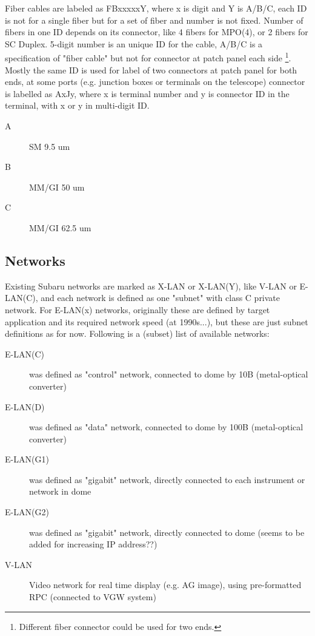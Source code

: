 \documentclass[a4paper,notitlepage]{article}
\begin{document}
Fiber cables are labeled as FBxxxxxY, where x is digit and Y is A/B/C, 
each ID is not for a single fiber but for a set of fiber and number is not 
fixed. Number of fibers in one ID depends on its connector, like 4 fibers for 
MPO(4), or 2 fibers for SC Duplex. 
5-digit number is an unique ID for the cable, A/B/C is a specification of 
"fiber cable" but not for connector at patch panel each side
\footnote{Different fiber connector could be used for two ends.}.
Mostly the same ID is used for label of two connectors at patch panel for both 
ends, at some ports (e.g. junction boxes or terminals on the telescope) 
connector is labelled as AxJy, where x is terminal number and y is 
connector ID in the terminal, with x or y in multi-digit ID. 

\begin{description}
  \item[A] SM 9.5 um
  \item[B] MM/GI 50 um 
  \item[C] MM/GI 62.5 um
\end{description}

\subsection{Networks}

Existing Subaru networks are marked as X-LAN or X-LAN(Y), like V-LAN or 
E-LAN(C), and each network is defined as one "subnet" with class C private 
network. 
For E-LAN(x) networks, originally these are defined by target application 
and its required network speed (at 1990s...), but these are just subnet 
definitions as for now. 
Following is a (subset) list of available networks: 

\begin{description}
  \item[E-LAN(C)] was defined as "control" network, connected to dome by 10B 
    (metal-optical converter)
  \item[E-LAN(D)] was defined as "data" network, connected to dome by 100B 
    (metal-optical converter)
  \item[E-LAN(G1)] was defined as "gigabit" network, directly connected to 
    each instrument or network in dome
  \item[E-LAN(G2)] was defined as "gigabit" network, directly connected to 
    dome (seems to be added for increasing IP address??)
  \item[V-LAN] Video network for real time display (e.g. AG image),
    using pre-formatted RPC (connected to VGW system)
\end{description}
\end{document}
